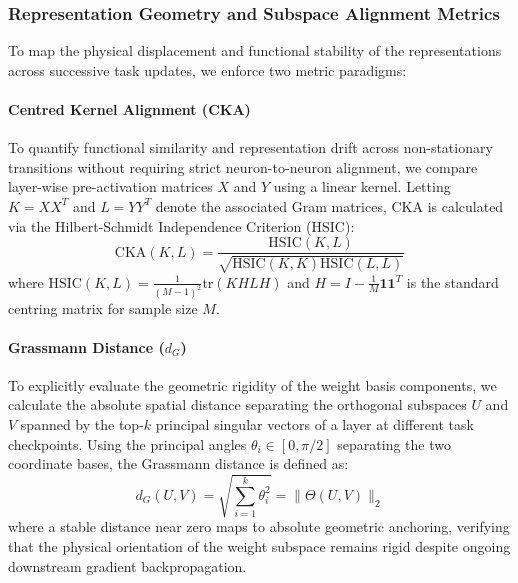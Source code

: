 \documentclass[10pt,a4paper]{article}
\begin{document}
	\subsubsection{Representation Geometry and Subspace Alignment Metrics}
	To map the physical displacement and functional stability of the representations across successive task updates, we enforce two metric paradigms:
	
	\paragraph{Centred Kernel Alignment (CKA)} 
	To quantify functional similarity and representation drift across non-stationary transitions without requiring strict neuron-to-neuron alignment, we compare layer-wise pre-activation matrices $X$ and $Y$ using a linear kernel. Letting $K = XX^T$ and $L = YY^T$ denote the associated Gram matrices, CKA is calculated via the Hilbert-Schmidt Independence Criterion ($\text{HSIC}$):
	\begin{equation}
		\text{CKA}(K, L) = \frac{\text{HSIC}(K, L)}{\sqrt{\text{HSIC}(K, K)\text{HSIC}(L, L)}}
	\end{equation}
	where $\text{HSIC}(K,L) = \frac{1}{(M-1)^2} \text{tr}(KHLH)$ and $H = I - \frac{1}{M}\mathbf{1}\mathbf{1}^T$ is the standard centring matrix for sample size $M$.
	
	\paragraph{Grassmann Distance ($d_G$)} 
	To explicitly evaluate the geometric rigidity of the weight basis components, we calculate the absolute spatial distance separating the orthogonal subspaces $U$ and $V$ spanned by the top-$k$ principal singular vectors of a layer at different task checkpoints. Using the principal angles $\theta_i \in [0, \pi/2]$ separating the two coordinate bases, the Grassmann distance is defined as:
	\begin{equation}
		d_G(U, V) = \sqrt{\sum_{i=1}^k \theta_i^2} = \|\Theta(U, V)\|_2
	\end{equation}
	where a stable distance near zero maps to absolute geometric anchoring, verifying that the physical orientation of the weight subspace remains rigid despite ongoing downstream gradient backpropagation.
\end{document}
